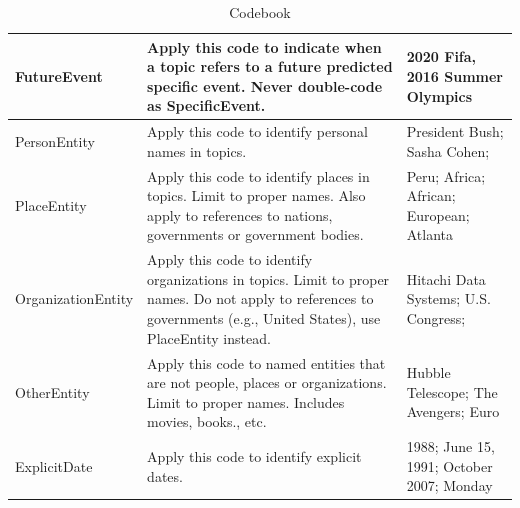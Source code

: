 \documentclass{sig-alternate}
\begin{document}
\begin{table}[H]
\begin{tabular}{| l | p{7cm}  | p{7cm}  |}
FutureEvent & Apply this code to indicate when a topic refers to a future predicted specific event. Never double-code as SpecificEvent. & 2020 Fifa, 2016 Summer Olympics \\ \hline
PersonEntity & Apply this code to identify personal names in topics. & President Bush; Sasha Cohen;  \\ \hline
PlaceEntity & Apply this code to identify places in topics. Limit to proper names.  Also apply to references to nations, governments or government bodies. & Peru; Africa; African; European; Atlanta \\ \hline
OrganizationEntity & Apply this code to identify organizations in topics. Limit to proper names.  Do not apply to references to governments (e.g., United States), use PlaceEntity instead. & Hitachi Data Systems; U.S. Congress; \\ \hline
OtherEntity & Apply this code to named entities that are not people, places or organizations. Limit to proper names. Includes movies, books., etc. & Hubble Telescope; The Avengers; Euro	\\ \hline
ExplicitDate & Apply this code to identify explicit dates. & 1988; June 15, 1991; October 2007; Monday \\ \hline
\end{tabular}
\caption{Codebook}
\label{table.codebook}
\end{table}
\end{document}
